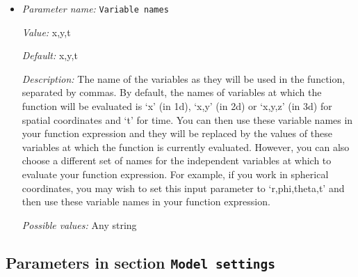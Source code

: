 \begin{itemize}
{\it Description:} The formula that denotes the function you want to evaluate for particular values of the independent variables. This expression may contain any of the usual operations such as addition or multiplication, as well as all of the common functions such as `sin' or `cos'. In addition, it may contain expressions like `if(x>0, 1, -1)' where the expression evaluates to the second argument if the first argument is true, and to the third argument otherwise. For a full overview of possible expressions accepted see the documentation of the muparser library at http://muparser.beltoforion.de/.

If the function you are describing represents a vector-valued function with multiple components, then separate the expressions for individual components by a semicolon.


{\it Possible values:} Any string
\item {\it Parameter name:} {\tt Variable names}
\label{parameters:Mesh refinement/Minimum refinement function/Variable names}


{\it Value:} x,y,t


{\it Default:} x,y,t


{\it Description:} The name of the variables as they will be used in the function, separated by commas. By default, the names of variables at which the function will be evaluated is `x' (in 1d), `x,y' (in 2d) or `x,y,z' (in 3d) for spatial coordinates and `t' for time. You can then use these variable names in your function expression and they will be replaced by the values of these variables at which the function is currently evaluated. However, you can also choose a different set of names for the independent variables at which to evaluate your function expression. For example, if you work in spherical coordinates, you may wish to set this input parameter to `r,phi,theta,t' and then use these variable names in your function expression.


{\it Possible values:} Any string
\end{itemize}

\subsection{Parameters in section \tt Model settings}
\label{parameters:Model_20settings}

